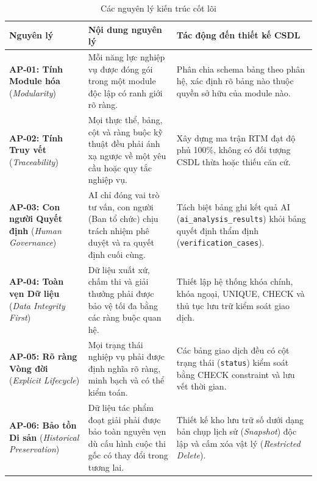 \begin{table}[!ht]
\centering
\caption{Các nguyên lý kiến trúc cốt lõi}
\label{tab:c3_principles}
\small
\begin{tabularx}{\textwidth}{p{3.2cm}p{5.5cm}>{\raggedright\arraybackslash}X}
\toprule
\textbf{Nguyên lý} & \textbf{Nội dung nguyên lý} & \textbf{Tác động đến thiết kế CSDL} \\
\midrule
\textbf{AP-01: Tính Module hóa} \newline (\textit{Modularity}) & 
Mỗi năng lực nghiệp vụ được đóng gói trong một module độc lập có ranh giới rõ ràng. & 
Phân chia schema bảng theo phân hệ, xác định rõ bảng nào thuộc quyền sở hữu của module nào. \\
\midrule
\textbf{AP-02: Tính Truy vết} \newline (\textit{Traceability}) & 
Mọi thực thể, bảng, cột và ràng buộc kỹ thuật đều phải ánh xạ ngược về một yêu cầu hoặc quy tắc nghiệp vụ. & 
Xây dựng ma trận RTM đạt độ phủ 100\%, không có đối tượng CSDL thừa hoặc thiếu căn cứ. \\
\midrule
\textbf{AP-03: Con người Quyết định} \newline (\textit{Human Governance}) & 
AI chỉ đóng vai trò tư vấn, con người (Ban tổ chức) chịu trách nhiệm phê duyệt và ra quyết định cuối cùng. & 
Tách biệt bảng ghi kết quả AI (\texttt{ai\_analysis\_results}) khỏi bảng quyết định thẩm định (\texttt{verification\_cases}). \\
\midrule
\textbf{AP-04: Toàn vẹn Dữ liệu} \newline (\textit{Data Integrity First}) & 
Dữ liệu xuất xứ, chấm thi và giải thưởng phải được bảo vệ tối đa bằng các ràng buộc quan hệ. & 
Thiết lập hệ thống khóa chính, khóa ngoại, UNIQUE, CHECK và thủ tục lưu trữ kiểm soát giao dịch. \\
\midrule
\textbf{AP-05: Rõ ràng Vòng đời} \newline (\textit{Explicit Lifecycle}) & 
Mọi trạng thái nghiệp vụ phải được định nghĩa rõ ràng, minh bạch và có thể kiểm toán. & 
Các bảng giao dịch đều có cột trạng thái (\texttt{status}) kiểm soát bằng CHECK constraint và lưu vết thời gian. \\
\midrule
\textbf{AP-06: Bảo tồn Di sản} \newline (\textit{Historical Preservation}) & 
Dữ liệu tác phẩm đoạt giải phải được bảo toàn nguyên vẹn dù cấu hình cuộc thi gốc có thay đổi trong tương lai. & 
Thiết kế kho lưu trữ số dưới dạng bản chụp lịch sử (\textit{Snapshot}) độc lập và cấm xóa vật lý (\textit{Restricted Delete}). \\

\end{tabularx}
\end{table}
